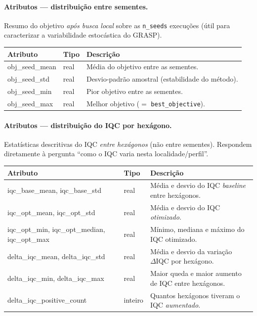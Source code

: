 \documentclass[11pt,a4paper]{article}
\begin{document}
\paragraph{Atributos --- distribuição entre sementes.}
Resumo do objetivo \emph{após busca local} sobre as \texttt{n\_seeds} execuções
(útil para caracterizar a variabilidade estocástica do GRASP).
\begin{center}\small
\begin{tabular}{@{}>{\ttfamily}l l p{8.0cm}@{}}
\toprule
\normalfont Atributo & \normalfont Tipo & \normalfont Descrição \\
\midrule
obj\_seed\_mean & real & Média do objetivo entre as sementes. \\
obj\_seed\_std  & real & Desvio-padrão amostral (estabilidade do método). \\
obj\_seed\_min  & real & Pior objetivo entre as sementes. \\
obj\_seed\_max  & real & Melhor objetivo ($=$ \texttt{best\_objective}). \\
\bottomrule
\end{tabular}
\end{center}

\paragraph{Atributos --- distribuição do IQC por hexágono.}
Estatísticas descritivas do IQC \emph{entre hexágonos} (não entre sementes).
Respondem diretamente à pergunta ``como o IQC varia nesta localidade/perfil''.
\begin{center}\small
\begin{tabular}{@{}>{\ttfamily}l l p{7.8cm}@{}}
\toprule
\normalfont Atributo & \normalfont Tipo & \normalfont Descrição \\
\midrule
iqc\_base\_mean, iqc\_base\_std & real & Média e desvio do IQC \emph{baseline} entre hexágonos. \\
iqc\_opt\_mean, iqc\_opt\_std   & real & Média e desvio do IQC \emph{otimizado}. \\
iqc\_opt\_min, iqc\_opt\_median, iqc\_opt\_max & real & Mínimo, mediana e máximo do IQC otimizado. \\
delta\_iqc\_mean, delta\_iqc\_std & real & Média e desvio da variação $\Delta\mathrm{IQC}$ por hexágono. \\
delta\_iqc\_min, delta\_iqc\_max & real & Maior queda e maior aumento de IQC entre hexágonos. \\
delta\_iqc\_positive\_count & inteiro & Quantos hexágonos tiveram o IQC \emph{aumentado}. \\
\bottomrule
\end{tabular}
\end{center}
\end{document}
